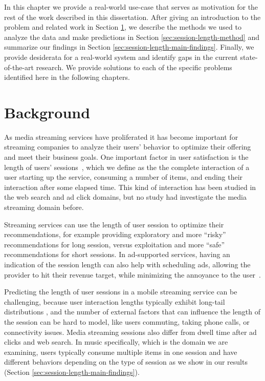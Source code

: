 \label{ch:session-length}
In this chapter we provide a real-world use-case that serves as motivation 
for the rest of the work described in this dissertation. After giving
an introduction to the problem and related work in Section \ref{sec:session-length-background},
we describe the methods we used to analyze the data and make predictions in
Section \ref{sec:session-length-method} and summarize our findings in Section
\ref{sec:session-length-main-findings}. Finally, we provide desiderata
for a real-world system and identify gaps in the current state-of-the-art
research. We provide solutions to each of the
specific problems identified here in the following chapters.

\section{Background}
\label{sec:session-length-background}

As media streaming services have proliferated it has become important for streaming
companies to analyze their users' behavior to optimize their offering and
meet their business goals. One important factor in user satisfaction is the length of
users' sessions~\cite{dwell-time-satisfaction}, which we define as the
the complete interaction of a
user starting up the service, consuming a number of items, and ending
their interaction after some elapsed time.
This kind of interaction has been studied in the web search \cite{dwell-time-satisfaction, search-time-model} and ad click \cite{post-click-ads, post-click-survival}
domains, but no study had investigate the media streaming domain before.

Streaming services can use the length of user session to optimize their
recommendations, for example providing exploratory and more ``risky'' recommendations
for long session, versus exploitation and more ``safe'' recommendations for short sessions.
In ad-supported services, having an indication of the session length can also help
with scheduling ads, allowing the provider to hit their revenue target, while
minimizing the annoyance to the user~\cite{annoying-ads}.

Predicting the length of user sessions in a mobile streaming service can be challenging,
because user interaction lengths
typically exhibit long-tail distributions \cite{post-click-survival, weibull-web-browsing, phonecalls}, and the number of external factors that can influence the length of the
session can be hard to model, like users commuting, taking phone calls, or connectivity
issues. Media streaming sessions also differ from dwell time after ad clicks
and web search. In music specifically, which is the domain we are examining,
users typically consume multiple items in one session and have different behaviors
depending on the type of session as we show in our results (Section \ref{sec:session-length-main-findings}).


